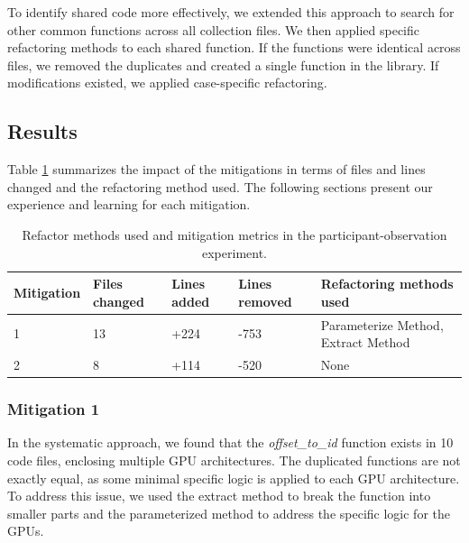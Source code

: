 \documentclass[10pt,conference]{IEEEtran}
\begin{document}
To identify shared code more effectively, we extended this approach to search for other common 
functions across all collection files. We then applied specific refactoring methods to each shared 
function. If the functions were identical across files, we removed the duplicates and created a single 
function in the library. If modifications existed, we applied case-specific refactoring.

\subsection{Results}
\label{subsec:participantresults}


Table \ref{tab:patch} summarizes the impact of the mitigations in terms of 
files and lines changed and the refactoring method used. The following sections present our experience and learning for each mitigation.

\begin{table}[ht]
\centering
\caption{Refactor methods used and mitigation metrics in the participant-observation experiment.}
\begin{tabular}{ | m{12mm} | m{10mm} | m{10mm} | m{14mm} | m{20mm} | }

\hline

\textbf{Mitigation} & \textbf{Files changed} & \textbf{Lines added} & \textbf{Lines removed} & \textbf{Refactoring methods used}
\\ \hline 

1 & 13 & +224 & -753 & Parameterize Method, Extract Method  \\ \hline
2 & 8 & +114 & -520 & None \\ \hline

\hline
\end{tabular}

\label{tab:patch}
\end{table}

\subsubsection{Mitigation 1}

In the systematic approach, we found that the \textit{offset\_to\_id} function 
exists in 10 code files, enclosing multiple GPU architectures. The duplicated 
functions are not exactly equal, as some minimal specific logic is applied to each GPU architecture. To address this issue, we used the extract method to 
break the function into smaller parts and the parameterized method to address 
the specific logic for the GPUs.
\end{document}
